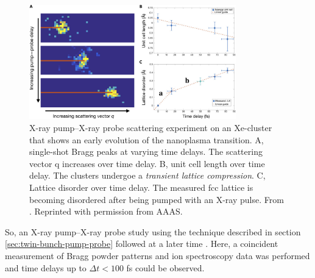 \begin{figure}
	\centering
		\includegraphics[width=0.80\textwidth]{images/ken-science.jpg}
	\caption[Experiment that shows early evolution of the nanoplasma transition.]{X-ray pump--X-ray probe scattering experiment on an Xe-cluster that shows an early evolution of the nanoplasma transition. A, single-shot Bragg peaks at varying time delays. The scattering vector q increases over time delay. B, unit cell length over time delay. The clusters undergoe a \textit{transient lattice compression}. C, Lattice disorder over time delay. The measured fcc lattice is becoming disordered after being pumped with an X-ray pulse. From \citep{Ferguson-2016-SciAdv}. Reprinted with permission from AAAS.}
	\label{fig:ken-science}
\end{figure}
So, an X-ray pump--X-ray probe study using the technique described in section \ref{sec:twin-bunch-pump-probe} followed at a later time \citep{Ferguson-2016-SciAdv}. Here, a coincident measurement of Bragg powder patterns and ion spectroscopy data was performed and time delays up to $\Delta t<100$ fs could be observed.
